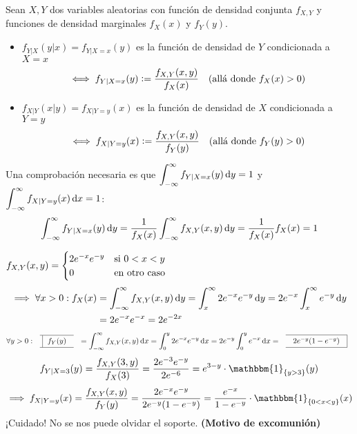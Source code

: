 \begin{defn}
	Sean $X, Y$ dos variables aleatorias con función de densidad conjunta $f_{X, Y}$ y funciones de densidad marginales $f_X(x)$ y $f_Y(y)$.
	\begin{itemize}
		\item $f_{Y|X}(y|x) = f_{Y|X=x}(y)$ es la función de densidad de $Y$ condicionada a $X=x$
		      \[\iff f_{Y|X=x} (y)\vcentcolon= \frac{f_{X, Y}(x, y)}{f_X(x)} \quad (\text{allá donde } f_X(x) > 0)\]
		\item $f_{X|Y}(x|y) = f_{X|Y=y}(x)$ es la función de densidad de $X$ condicionada a $Y=y$
		      \[\iff f_{X|Y=y} (x)\vcentcolon= \frac{f_{X, Y}(x, y)}{f_Y(y)} \quad (\text{allá donde } f_Y(y) > 0)\]
	\end{itemize}
	Una comprobación necesaria es que $\ds \int_{-\infty}^{\infty} f_{Y|X=x} (y) \odif{y} = 1$ y $\ds \int_{-\infty}^{\infty} f_{X|Y=y} (x) \odif{x} = 1$:
	\[\int_{-\infty}^{\infty} f_{Y|X=x} (y) \odif{y} = \frac{1}{f_X(x)} \int_{-\infty}^{\infty} f_{X, Y}(x, y) \odif{y} = \frac{1}{f_X(x)} f_X(x) = 1\]
\end{defn}

\begin{ejem}%
	$\displaystyle f_{X, Y}(x, y) = \begin{cases}
			2e^{-x}e^{-y} & \text{si } 0 < x < y \\
			0             & \text{en otro caso}
		\end{cases}$
	\[\begin{aligned}
			\implies \forall x > 0 :f_X(x) & = \int_{-\infty}^{\infty} f_{X, Y}(x, y) \odif{y} = \int_{x}^{\infty} 2e^{-x}e^{-y} \odif{y} = 2e^{-x} \int_{x}^{\infty} e^{-y} \odif{y} \\
			                               & = 2e^{-x} e^{-x} = 2e^{-2x}
		\end{aligned}\]
	\[\forall y > 0 : \lbox{f_Y(y)} = \int_{-\infty}^{\infty} f_{X, Y}(x, y) \odif{x} = \int_{0}^{y} 2e^{-x}e^{-y} \odif{x} = 2e^{-y} \int_{0}^{y} e^{-x} \odif{x} = \rbox{2e^{-y} (1 - e^{-y})}\]
	\[f_{Y|X=3} (y) = \frac{f_{X, Y}(3, y)}{f_X(3)} = \frac{2e^{-3}e^{-y}}{2e^{-6}} = e^{3-y} \cdot \mathbbm{1}_{\{y>3\}}(y)\]
	\[\implies f_{X|Y=y} (x) = \frac{f_{X, Y}(x, y)}{f_Y(y)} = \frac{2e^{-x}e^{-y}}{2e^{-y}(1-e^{-y})} = \frac{e^{-x}}{1-e^{-y}} \cdot \mathbbm{1}_{\{0<x<y\}}(x)\]
	¡Cuidado! No se nos puede olvidar el soporte. \hspace{\fill} \textbf{(Motivo de excomunión)}
\end{ejem}

